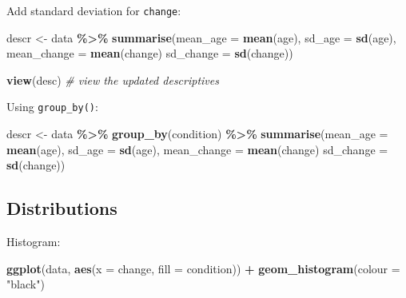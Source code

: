 \documentclass[
]{book}
\newenvironment{Shaded}{\begin{snugshade}}{\end{snugshade}}
\newcommand{\AttributeTok}[1]{\textcolor[rgb]{0.13,0.29,0.53}{#1}}
\newcommand{\CommentTok}[1]{\textcolor[rgb]{0.56,0.35,0.01}{\textit{#1}}}
\newcommand{\FunctionTok}[1]{\textcolor[rgb]{0.13,0.29,0.53}{\textbf{#1}}}
\newcommand{\NormalTok}[1]{#1}
\newcommand{\OtherTok}[1]{\textcolor[rgb]{0.56,0.35,0.01}{#1}}
\newcommand{\SpecialCharTok}[1]{\textcolor[rgb]{0.81,0.36,0.00}{\textbf{#1}}}
\newcommand{\StringTok}[1]{\textcolor[rgb]{0.31,0.60,0.02}{#1}}
\begin{document}
Add standard deviation for \texttt{change}:

\begin{Shaded}
\begin{Highlighting}[]
\NormalTok{descr }\OtherTok{\textless{}{-}}\NormalTok{ data }\SpecialCharTok{\%\textgreater{}\%}  
    \FunctionTok{summarise}\NormalTok{(}\AttributeTok{mean\_age =} \FunctionTok{mean}\NormalTok{(age),}
              \AttributeTok{sd\_age =} \FunctionTok{sd}\NormalTok{(age),}
              \AttributeTok{mean\_change =} \FunctionTok{mean}\NormalTok{(change)}
              \AttributeTok{sd\_change =} \FunctionTok{sd}\NormalTok{(change))}

\FunctionTok{view}\NormalTok{(desc) }\CommentTok{\# view the updated descriptives}
\end{Highlighting}
\end{Shaded}

Using \texttt{group\_by()}:

\begin{Shaded}
\begin{Highlighting}[]
\NormalTok{descr }\OtherTok{\textless{}{-}}\NormalTok{ data }\SpecialCharTok{\%\textgreater{}\%}
  \FunctionTok{group\_by}\NormalTok{(condition) }\SpecialCharTok{\%\textgreater{}\%}
    \FunctionTok{summarise}\NormalTok{(}\AttributeTok{mean\_age =} \FunctionTok{mean}\NormalTok{(age),}
              \AttributeTok{sd\_age =} \FunctionTok{sd}\NormalTok{(age),}
              \AttributeTok{mean\_change =} \FunctionTok{mean}\NormalTok{(change)}
              \AttributeTok{sd\_change =} \FunctionTok{sd}\NormalTok{(change))}
\end{Highlighting}
\end{Shaded}

\subsection{Distributions}\label{distributions}

Histogram:

\begin{Shaded}
\begin{Highlighting}[]
\FunctionTok{ggplot}\NormalTok{(data, }\FunctionTok{aes}\NormalTok{(}\AttributeTok{x =}\NormalTok{ change, }\AttributeTok{fill =}\NormalTok{ condition)) }\SpecialCharTok{+}
      \FunctionTok{geom\_histogram}\NormalTok{(}\AttributeTok{colour =} \StringTok{"black"}\NormalTok{)}
\end{Highlighting}
\end{Shaded}
\end{document}
